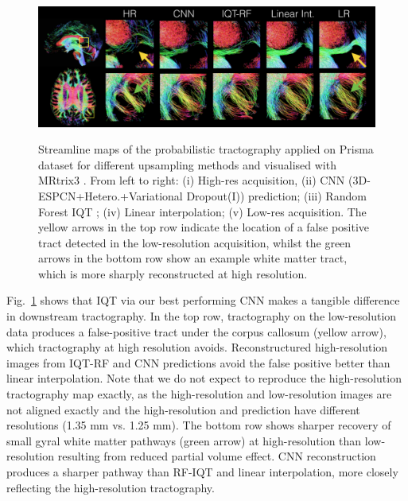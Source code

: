 \begin{figure}[ht]
	\vspace{3mm}
	\centering
	\includegraphics[width=\linewidth]{chapter_3/figures/figure_7_5.png}\label{fig:uncertainty_map}
	\small
	\caption{Streamline maps of the probabilistic tractography \cite{tournier2010improved} applied on Prisma dataset for different upsampling methods and visualised with MRtrix3 \cite{tournier2012mrtrix}. From left to right: (i) High-res acquisition, (ii) CNN (3D-ESPCN+Hetero.+Variational Dropout(I)) prediction; (iii) Random Forest IQT \cite{alexander2017image}; (iv) Linear interpolation; (v) Low-res acquisition. The yellow arrows in the top row indicate the location of a false positive tract detected in the low-resolution acquisition, whilst the green arrows in the bottom row show an example white matter tract, which is more sharply reconstructed at high resolution. } 
	\label{fig:tract}
\end{figure}

\clearpage
Fig.~\ref{fig:tract} shows that IQT via our best performing CNN makes a tangible difference in downstream tractography. In the top row, tractography on the low-resolution data produces a false-positive tract under the corpus callosum (yellow arrow), which tractography at high resolution avoids. Reconstructured high-resolution images from IQT-RF and CNN predictions avoid the false positive better than linear interpolation. Note that we do not expect to reproduce the high-resolution tractography map exactly, as the high-resolution and low-resolution images are not aligned exactly and the high-resolution and prediction have different resolutions (1.35 mm vs. 1.25 mm). The bottom row shows sharper recovery of small gyral white matter pathways (green arrow) at high-resolution than low-resolution resulting from reduced partial volume effect. CNN reconstruction produces a sharper pathway than RF-IQT and linear interpolation, more closely reflecting the high-resolution tractography.

